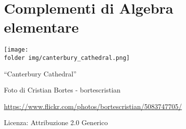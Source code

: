 \part{Complementi di Algebra elementare}

\texttt{[image: \\folder img/canterbury\_cathedral.png]}
  \begin{center}
    {\large ``Canterbury Cathedral''}\par
    Foto di Cristian Bortes - bortescristian\par
    \url{https://www.flickr.com/photos/bortescristian/5083747705/}\par
    Licenza: Attribuzione 2.0 Generico\par
  \end{center}
\clearpage
\cleardoublepage
